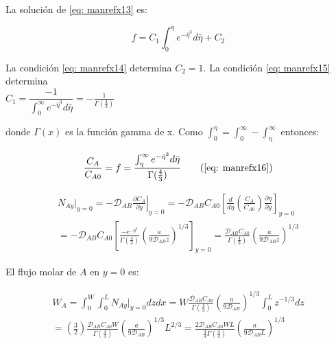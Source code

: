 La solución de \eqref{eq: manrefx13} es:

\begin{equation} \label{eq: manrefx16}
	f = C_1 \int_0^\eta e^{-\bar{\eta}^3} d \bar{\eta} + C_2
\end{equation}

La condición \eqref{eq: manrefx14} determina $C_2 = 1$. La condición \eqref{eq: manrefx15} determina \\ $C_1 = \dfrac{-1}{\int_0^\infty e^{-\bar{\eta}^3} d \bar{\eta}} = - \frac{1}{\Gamma (\frac{4}{3})}$ 

donde $\Gamma (x)$ es la función gamma de x. Como $\int_0^\eta = \int_0^\infty - \int_\eta^\infty$ entonces:

\begin{equation} \label{eq: manrefx16.1}
	\frac{C_A}{C_{A0}} = f =  \frac{\int_\eta^\infty e^{-\bar{\eta}^3} d\bar{\eta}}{\Gamma(\frac{4}{3})}
	\tag{\ref{eq: manrefx16}}
\end{equation}

\begin{equation}
	\begin{split}
	N_{Ay}|_{y=0} = - \mathscr{D}_{AB} \left.  \frac{\partial C_A}{\partial y} \right|_{y=0} = - \mathscr{D}_{AB} C_{A0} \left[ \frac{d}{d\eta} \left( \frac{C_A}{C_{A0}} \right) \frac{\partial \eta}{\partial y} \right]_{y=0} 
	\\
  = -\mathscr{D}_{AB} C_{A0} \left[ \frac{- e^{-\eta^3}}{\Gamma(\frac{4}{3})} \left( \frac{a}{9 \mathscr{D}_{AB}z} \right)^{1/3} \right]_{y=0} = \frac{\mathscr{D}_{AB} C_{A0}}{\Gamma (\frac{4}{3})} \left( \frac{a}{9 \mathscr{D}_{AB} z} \right)^{1/3}
	\end{split}
\end{equation}

El flujo molar de $A$ en $y=0$ es:

\begin{equation}
	\begin{split}
	W_A = \int_0^W \int_0^L N_{Ay}|_{y=0} dz dx
	=W \frac{\mathscr{D}_{AB} C_{A0}}{\Gamma(\frac{4}{3})} \left( \frac{a}{9 \mathscr{D}_{AB}} \right)^{1/3} \int_0^L z^{-1/3} dz \\
	=\left( \frac{3}{2} \right) \frac{\mathscr{D}_{AB} C_{A0} W}{\Gamma (\frac{4}{3})} \left( \frac{a}{9 \mathscr{D}_{AB}} \right)^{1/3} L^{2/3}
	=\frac{2 \mathscr{D}_{AB} C_{A0} WL}{\frac{4}{3} \Gamma (\frac{4}{3})} \left( \frac{a}{9 \mathscr{D}_{AB} L} \right)^{1/3}
	\end{split}
\end{equation}

